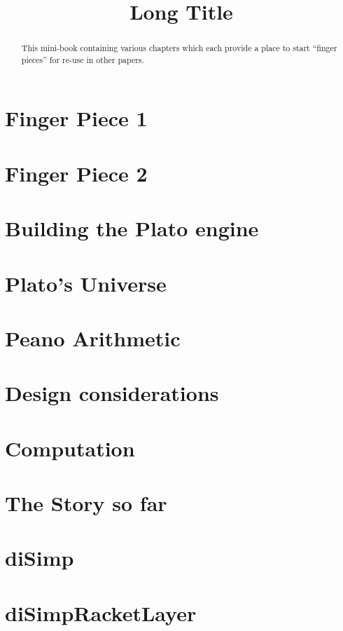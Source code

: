 \documentclass[a4paper,openany]{amsbook}
\begin{document}
\sloppy

\title[Short Title]{Long Title}

%

\begin{abstract}
This mini-book containing various chapters which each provide a place to start
``finger pieces'' for re-use in other papers.
\end{abstract} 
\maketitle 
\tableofcontents 


\chapter{Finger Piece 1}


\chapter{Finger Piece 2}


\chapter{Building the Plato engine}


\chapter{Plato's Universe}


\chapter{Peano Arithmetic}


\chapter{Design considerations}


\chapter{Computation}


\chapter{The Story so far}


\appendix
\chapter{diSimp}


\chapter{diSimpRacketLayer}



\printbibliography
\end{document}
